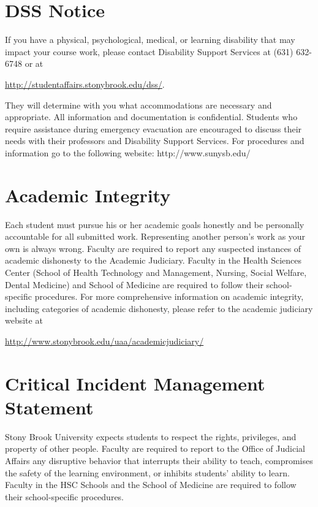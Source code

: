 \documentclass[11pt]{amsart}
\numberwithin{equation}{section}
\begin{document}
\section{DSS Notice}
If you have a physical, psychological, medical, or learning disability that may impact your course work, please contact Disability Support Services at (631) 632-6748 or at
\begin{center}
\url{http://studentaffairs.stonybrook.edu/dss/}.
\end{center}
They will determine with you what accommodations are necessary and appropriate. All information and documentation is confidential. Students who require assistance during emergency evacuation are encouraged to discuss their needs with their professors and Disability Support Services. For procedures and information go to the following website: http://www.sunysb.edu/

\section{Academic Integrity}
Each student must pursue his or her academic goals honestly and be personally accountable for all submitted work. Representing another person's work as your own is always wrong. Faculty are required to report any suspected instances of academic dishonesty to the Academic Judiciary. Faculty in the Health Sciences Center (School of Health Technology and Management, Nursing, Social Welfare, Dental Medicine) and School of Medicine are required to follow their school-specific procedures. For more comprehensive information on academic integrity, including categories of academic dishonesty, please refer to the academic judiciary website at
\begin{center}
\url{http://www.stonybrook.edu/uaa/academicjudiciary/}
\end{center}

\section{Critical Incident Management Statement}
Stony Brook University expects students to respect the rights, privileges, and property of other people. Faculty are required to report to the Office of Judicial Affairs any disruptive behavior that interrupts their ability to teach, compromises the safety of the learning environment, or inhibits students' ability to learn. Faculty in the HSC Schools and the School of Medicine are required to follow their school-specific procedures.
\end{document}
